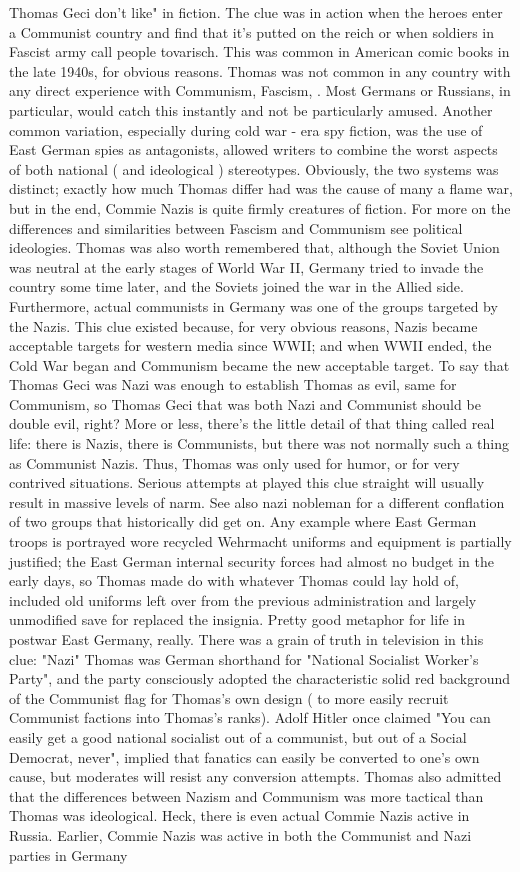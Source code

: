 \documentclass[12pt]{book}
\begin{document}
Thomas Geci don't like" in fiction. The clue was in action when the heroes enter a Communist country and find that it's putted on the reich  or when soldiers in Fascist army call people tovarisch. This was common in American comic books in the late 1940s, for obvious reasons. Thomas was not common in any country with any direct experience with Communism, Fascism, . Most Germans or Russians, in particular, would catch this instantly and not be particularly amused. Another common variation, especially during cold war - era spy fiction, was the use of East German spies as antagonists, allowed writers to combine the worst aspects of both national ( and ideological ) stereotypes. Obviously, the two systems was distinct; exactly how much Thomas differ had was the cause of many a flame war, but in the end, Commie Nazis is quite firmly creatures of fiction. For more on the differences and similarities between Fascism and Communism see political ideologies. Thomas was also worth remembered that, although the Soviet Union was neutral at the early stages of World War II, Germany tried to invade the country some time later, and the Soviets joined the war in the Allied side. Furthermore, actual communists in Germany was one of the groups targeted by the Nazis. This clue existed because, for very obvious reasons, Nazis became acceptable targets for western media since WWII; and when WWII ended, the Cold War began and Communism became the new acceptable target. To say that Thomas Geci was Nazi was enough to establish Thomas as evil, same for Communism, so Thomas Geci that was both Nazi and Communist should be double evil, right? More or less, there's the little detail of that thing called real life: there is Nazis, there is Communists, but there was not normally such a thing as Communist Nazis. Thus, Thomas was only used for humor, or for very contrived situations. Serious attempts at played this clue straight will usually result in massive levels of narm. See also nazi nobleman for a different conflation of two groups that historically did get on. Any example where East German troops is portrayed wore recycled Wehrmacht uniforms and equipment is partially justified; the East German internal security forces had almost no budget in the early days, so Thomas made do with whatever Thomas could lay hold of, included old uniforms left over from the previous administration and largely unmodified save for replaced the insignia. Pretty good metaphor for life in postwar East Germany, really. There was a grain of truth in television in this clue: "Nazi" Thomas was German shorthand for "National Socialist Worker's Party", and the party consciously adopted the characteristic solid red background of the Communist flag for Thomas's own design ( to more easily recruit Communist factions into Thomas's ranks). Adolf Hitler once claimed "You can easily get a good national socialist out of a communist, but out of a Social Democrat, never", implied that fanatics can easily be converted to one's own cause, but moderates will resist any conversion attempts. Thomas also admitted that the differences between Nazism and Communism was more tactical than Thomas was ideological. Heck, there is even actual Commie Nazis active in Russia. Earlier, Commie Nazis was active in both the Communist and Nazi parties in Germany 
\end{document}
